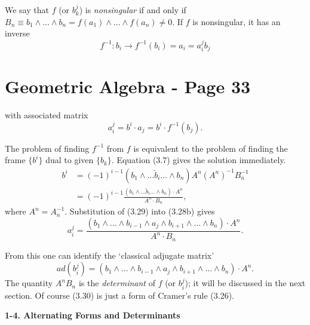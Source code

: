 \documentclass[fleqn]{scrartcl}
\numberwithin{equation}{section}
\begin{document}
\vspace{1em}
\noindent We say that \(f\) (or \(b_k^j\)) is \textit{nonsingular} if and only if \(B_n \equiv b_1 \wedge \dots \wedge b_n = f(a_1) \wedge \dots \wedge f(a_n) \neq 0\). If \(f\) is nonsingular, it has an inverse
\begin{equation}
f^{-1} \colon b_i \to f^{-1}(b_i) = a_i = a_i^j b_j \tag{3.28a}
\end{equation}

\section*{Geometric Algebra - Page 33}

\noindent with associated matrix
\begin{equation}
a_i^j = b^i \cdot a_j = b^i \cdot f^{-1}(b_j). \tag{3.28b}
\end{equation}

\noindent The problem of finding \(f^{-1}\) from \(f\) is equivalent to the problem of finding the frame \(\{b^i\}\) dual to given \(\{b_k\}\). Equation (3.7) gives the solution immediately.
\begin{equation}
\begin{aligned}
b^i &= (-1)^{i-1}(b_1 \wedge \dots \breve{b}_i \dots \wedge b_n) A^n (A^n)^{-1} B_n^{-1} \\
&= (-1)^{i-1} \frac{(b_1 \wedge \dots \breve{b}_i \dots \wedge b_n) \cdot A^n}{A^n \cdot B_n},
\end{aligned}
\tag{3.29}
\end{equation}
where \(A^n = A_n^{-1}\). Substitution of (3.29) into (3.28b) gives
\begin{equation}
a_i^j = \frac{(b_1 \wedge \dots \wedge b_{i-1} \wedge a_j \wedge b_{i+1} \wedge \dots \wedge b_n) \cdot A^n}{A^n \cdot B_n}. \tag{3.30}
\end{equation}

\noindent From this one can identify the `classical adjugate matrix'
\begin{equation}
ad(b_i^j) = (b_1 \wedge \dots \wedge b_{i-1} \wedge a_j \wedge b_{i+1} \wedge \dots \wedge b_n) \cdot A^n. \tag{3.31}
\end{equation}
The quantity \(A^n B_n\) is the \textit{determinant} of \(f\) (or \(b_i^j\)); it will be discussed in the next section. Of course (3.30) is just a form of Cramer's rule (3.26).

\vspace{1.5em}
\noindent\textbf{1-4. Alternating Forms and Determinants}
\end{document}
